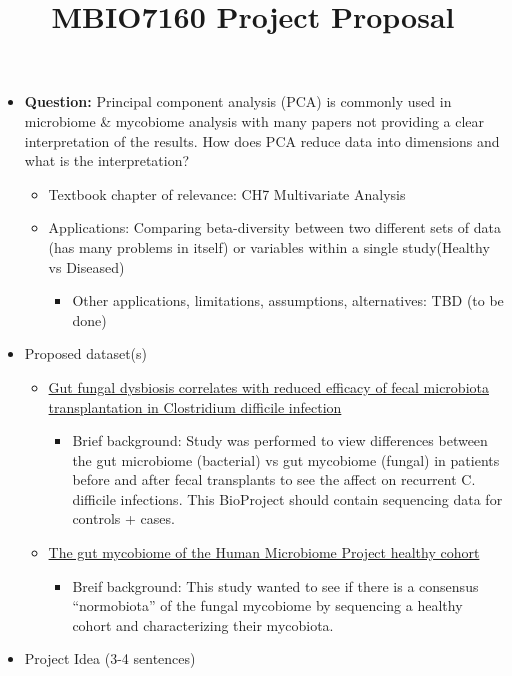 \documentclass[]{article}
\title{MBIO7160 Project Proposal}
\author{}
\date{}
\providecommand{\tightlist}{%
  \setlength{\itemsep}{0pt}\setlength{\parskip}{0pt}}
\begin{document}
\maketitle

\begin{itemize}
\tightlist
\item
  \textbf{Question:} Principal component analysis (PCA) is commonly used
  in microbiome \& mycobiome analysis with many papers not providing a
  clear interpretation of the results. How does PCA reduce data into
  dimensions and what is the interpretation?

  \begin{itemize}
  \tightlist
  \item
    Textbook chapter of relevance: CH7 Multivariate Analysis
  \item
    Applications: Comparing beta-diversity between two different sets of
    data (has many problems in itself) or variables within a single
    study(Healthy vs Diseased)

    \begin{itemize}
    \tightlist
    \item
      Other applications, limitations, assumptions, alternatives: TBD
      (to be done)
    \end{itemize}
  \end{itemize}
\item
  Proposed dataset(s)

  \begin{itemize}
  \tightlist
  \item
    \href{https://www.ncbi.nlm.nih.gov/bioproject/?term=PRJNA419104}{Gut
    fungal dysbiosis correlates with reduced efficacy of fecal
    microbiota transplantation in Clostridium difficile infection}

    \begin{itemize}
    \tightlist
    \item
      Brief background: Study was performed to view differences between
      the gut microbiome (bacterial) vs gut mycobiome (fungal) in
      patients before and after fecal transplants to see the affect on
      recurrent C. difficile infections. This BioProject should contain
      sequencing data for controls + cases.
    \end{itemize}
  \item
    \href{https://www.ncbi.nlm.nih.gov/bioproject/PRJNA356769/}{The gut
    mycobiome of the Human Microbiome Project healthy cohort}

    \begin{itemize}
    \tightlist
    \item
      Breif background: This study wanted to see if there is a consensus
      ``normobiota'' of the fungal mycobiome by sequencing a healthy
      cohort and characterizing their mycobiota.
    \end{itemize}
  \end{itemize}
\item
  Project Idea (3-4 sentences)


\end{itemize}
\end{document}
